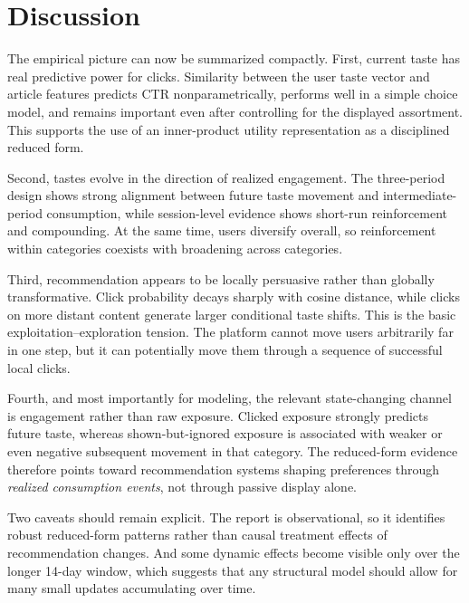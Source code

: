 \documentclass[11pt]{article}
\begin{document}
\section{Discussion}
\label{sec:discussion}

The empirical picture can now be summarized compactly. First, current taste has real predictive power for clicks. Similarity between the user taste vector and article features predicts CTR nonparametrically, performs well in a simple choice model, and remains important even after controlling for the displayed assortment. This supports the use of an inner-product utility representation as a disciplined reduced form.

Second, tastes evolve in the direction of realized engagement. The three-period design shows strong alignment between future taste movement and intermediate-period consumption, while session-level evidence shows short-run reinforcement and compounding. At the same time, users diversify overall, so reinforcement within categories coexists with broadening across categories.

Third, recommendation appears to be locally persuasive rather than globally transformative. Click probability decays sharply with cosine distance, while clicks on more distant content generate larger conditional taste shifts. This is the basic exploitation--exploration tension. The platform cannot move users arbitrarily far in one step, but it can potentially move them through a sequence of successful local clicks.

Fourth, and most importantly for modeling, the relevant state-changing channel is engagement rather than raw exposure. Clicked exposure strongly predicts future taste, whereas shown-but-ignored exposure is associated with weaker or even negative subsequent movement in that category. The reduced-form evidence therefore points toward recommendation systems shaping preferences through \emph{realized consumption events}, not through passive display alone.

Two caveats should remain explicit. The report is observational, so it identifies robust reduced-form patterns rather than causal treatment effects of recommendation changes. And some dynamic effects become visible only over the longer 14-day window, which suggests that any structural model should allow for many small updates accumulating over time.
\end{document}
